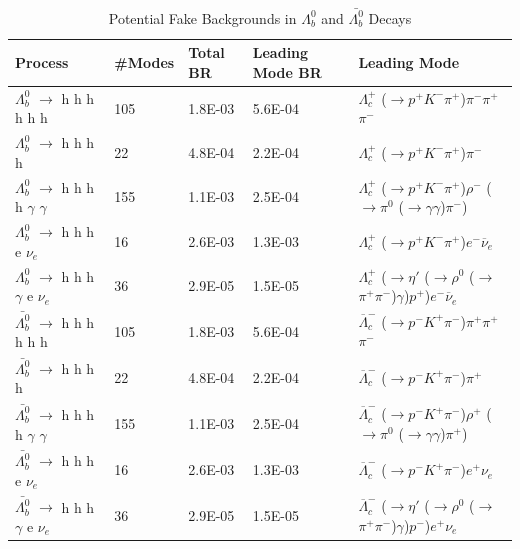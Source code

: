 \begin{table}[!ht]        
    \small
    \begin{tabular}{|| l | l | l | l | l ||}
        \hline
        {\textbf {Process}} & {\textbf {\#Modes}} & {\textbf {Total BR}} & {\textbf {Leading Mode BR}} & {\textbf {Leading Mode}}\\
        \hline
        $\Lambda_b^0$ $\to$ h h h h h h & 105 & 1.8E-03 & 5.6E-04 & $\Lambda_c^+$ ($\rightarrow$$p^+$$K^-$$\pi^+$)$\pi^-$$\pi^+$$\pi^-$  \\
        $\Lambda_b^0$ $\to$ h h h h & 22 & 4.8E-04 & 2.2E-04 & $\Lambda_c^+$ ($\rightarrow$$p^+$$K^-$$\pi^+$)$\pi^-$  \\
        $\Lambda_b^0$ $\to$ h h h h $\gamma$ $\gamma$ & 155 & 1.1E-03 & 2.5E-04 & $\Lambda_c^+$ ($\rightarrow$$p^+$$K^-$$\pi^+$)$\rho^-$ ($\rightarrow$$\pi^0$ ($\rightarrow$$\gamma$$\gamma$)$\pi^-$) \\
        $\Lambda_b^0$ $\to$ h h h e $\nu_e$ & 16 & 2.6E-03 & 1.3E-03 & $\Lambda_c^+$ ($\rightarrow$$p^+$$K^-$$\pi^+$)$e^-$$\overline{\nu}_e$  \\
        $\Lambda_b^0$ $\to$ h h h $\gamma$ e $\nu_e$ & 36 & 2.9E-05 & 1.5E-05 & $\Lambda_c^+$ ($\rightarrow$$\eta'$ ($\rightarrow$$\rho^0$ ($\rightarrow$$\pi^+$$\pi^-$)$\gamma$)$p^+$)$e^-$$\overline{\nu}_e$  \\
        $\bar{\Lambda_b^0}$ $\to$ h h h h h h & 105 & 1.8E-03 & 5.6E-04 & $\overline{\Lambda}_c^-$ ($\rightarrow$$p^-$$K^+$$\pi^-$)$\pi^+$$\pi^+$$\pi^-$  \\
        $\bar{\Lambda_b^0}$ $\to$ h h h h & 22 & 4.8E-04 & 2.2E-04 & $\overline{\Lambda}_c^-$ ($\rightarrow$$p^-$$K^+$$\pi^-$)$\pi^+$  \\
        $\bar{\Lambda_b^0}$ $\to$ h h h h  $\gamma$ $\gamma$ & 155 & 1.1E-03 & 2.5E-04 & $\overline{\Lambda}_c^-$ ($\rightarrow$$p^-$$K^+$$\pi^-$)$\rho^+$ ($\rightarrow$$\pi^0$ ($\rightarrow$$\gamma$$\gamma$)$\pi^+$) \\
        $\bar{\Lambda_b^0}$ $\to$ h h h e $\nu_e$ & 16 & 2.6E-03 & 1.3E-03 & $\overline{\Lambda}_c^-$ ($\rightarrow$$p^-$$K^+$$\pi^-$)$e^+$$\nu_e$  \\
        $\bar{\Lambda_b^0}$ $\to$ h h h $\gamma$ e $\nu_e$ & 36 & 2.9E-05 & 1.5E-05 & $\overline{\Lambda}_c^-$ ($\rightarrow$$\eta'$ ($\rightarrow$$\rho^0$ ($\rightarrow$$\pi^+$$\pi^-$)$\gamma$)$p^-$)$e^+$$\nu_e$          \\
        \hline
    \end{tabular} 
    \caption{Potential Fake Backgrounds in $\Lambda_b^0$ and $\bar{\Lambda_b^0}$ Decays}
    \label{tab:potential-fake-backgrounds-lb}
\end{table}
